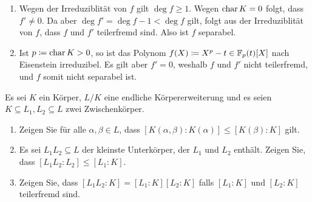 \begin{enumerate}
  \item
    Wegen der Irreduziblität von $f$ gilt $\deg f \geq 1$.
    Wegen $\operatorname{char} K = 0$ folgt, dass $f' \neq 0$.
    Da aber $\deg f' = \deg f - 1 < \deg f$ gilt, folgt aus der Irreduziblität von $f$, dass $f$ und $f'$ teilerfremd sind.
    Also ist $f$ separabel.
  \item
    Ist $p \coloneqq \operatorname{char} K > 0$, so ist das Polynom $f(X) \coloneqq X^p - t \in \mathbb{F}_p(t)[X]$ nach Eisenstein irreduzibel.
    Es gilt aber $f' = 0$, weshalb $f$ und $f'$ nicht teilerfremd, und $f$ somit nicht separabel ist.
\end{enumerate}


\begin{question}
  Es sei $K$ ein Körper, $L/K$ eine endliche Körpererweiterung und es seien $K \subseteq L_1, L_2 \subseteq L$ zwei Zwischenkörper.
  \begin{enumerate}
    \item
      Zeigen Sie für alle $\alpha, \beta \in L$, dass $[K(\alpha, \beta) : K(\alpha)] \leq [K(\beta) : K]$ gilt.
    \item
      Es sei $L_1 L_2 \subseteq L$ der kleinste Unterkörper, der $L_1$ und $L_2$ enthält.
      Zeigen Sie, dass $[L_1 L_2 : L_2] \leq [L_1 : K]$.
    \item
      Zeigen Sie, dass $[L_1 L_2 : K] = [L_1 : K] [L_2 : K]$ falls $[L_1 : K]$ und $[L_2 : K]$ teilerfremd sind.
  \end{enumerate}
\end{question}


